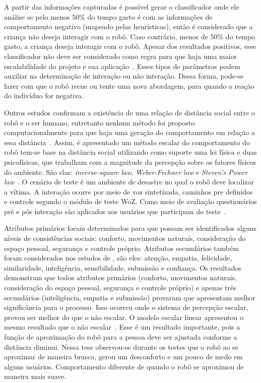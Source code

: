 A partir das informações capturadas é possível gerar o classificador onde ele análise se pelo menos 50\% do tempo gasto é com as informações de comportamento negativo (mapeado pelas heurísticas), então é considerado que a criança não deseja interagir com o robô. Caso contrário, menos de 50\% do tempo gasto, a criança deseja interagir com o robô. Apesar dos resultados positivos, esse classificador não deve ser considerado como regra para que haja uma maior escalabilidade do projeto e sua aplicação~\cite{feil-seifer:2010}. Esses tipos de parâmetros podem auxiliar na determinação de interação ou não interação. Dessa forma, pode-se fazer com que o robô recue ou tente uma nova abordagem, para quando a reação do indivíduo for negativa.

Outros estudos confirmam a existência de uma relação de distância social entre o robô e o ser humano, entretanto nenhum método foi proposto computacionalmente para que haja uma geração do comportamento em relação a essa distância~\cite{henkel:2012b}. Assim, é apresentado um método escalar do comportamento do robô tem-se base na distância social utilizando como suporte uma lei física e duas psicofísicas, que trabalham com a magnitude da percepção sobre os fatores físicos do ambiente. São elas: \emph{inverse-square law}, \emph{Weber-Fechner law} e \emph{Steven's Power law}~\cite{henkel:2012b}. O cenário de teste é um ambiente de desastre no qual o robô deve localizar a vítima. A interação ocorre por meio de voz sintetizada, caminhos pre definidos e controle segundo o módulo de teste WoZ. Como meio de avaliação questionários pré e pós interação são aplicados aos usuários que participam do teste~\cite{henkel:2012b}.

Atributos primários foram determinados para que possam ser identificados alguns níveis de consistências sociais: conforto, movimentos naturais, consideração do espaço pessoal, segurança e controle próprio. Atributos secundários também foram considerados nos estudos de \textcite{henkel:2012b}, são eles: atenção, empatia, felicidade, similaridade, inteligência, sensibilidade, submissão e confiança. Os resultados demonstram que todos atributos primários (conforto, movimentos naturais, consideração do espaço pessoal, segurança e controle próprio) e apenas três secundários (inteligência, empatia e submissão) provaram que apresentam melhor significância para o processo. Isso ocorreu onde o sistema de percepção escalar, provou ser melhor do que o não escalar. O modelo escalar linear apresentou o mesmo resultado que o não escalar~\cite{henkel:2012b}. Esse é um resultado importante, pois a função de aproximação do robô para a pessoa deve ser ajustada conforme a distância diminui. Nessa tese observou-se durante os testes que o robô ao se aproximar de maneira brusca, gerou um desconforto e um pouco de medo em alguns usuários. Comportamento diferente de quando o robô se aproximou de maneira mais suave.

